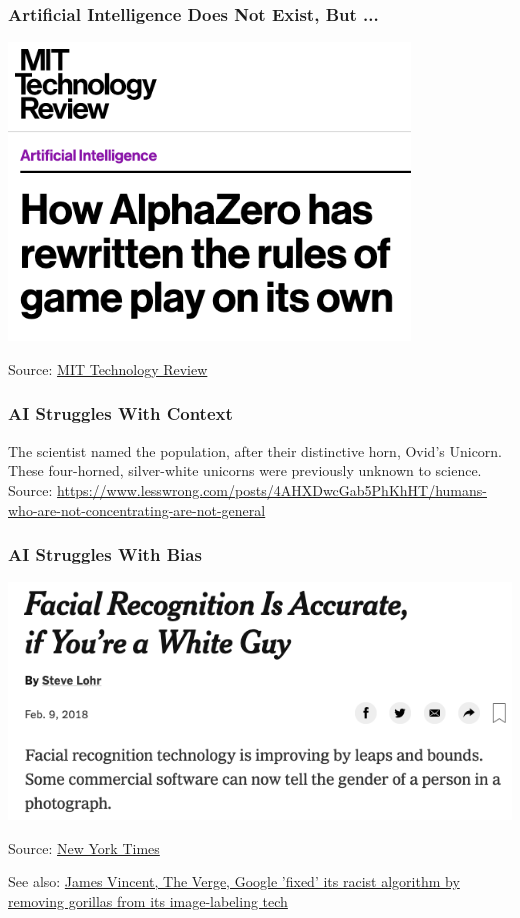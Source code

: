 \documentclass[xcolor=dvipsnames]{beamer}
\begin{document}
\begin{frame}
\frametitle{Artificial Intelligence Does Not Exist, But ...}
\includegraphics[width=0.8\textwidth]{figures/alpha_go}

Source: \href{https://www.technologyreview.com/s/612923/how-alphazero-has-rewritten-the-rules-of-gameplay-on-its-own/}{MIT Technology Review}
\end{frame}

\begin{frame}
\frametitle{AI Struggles With Context}
The scientist named the population, after their distinctive horn, Ovid’s Unicorn. These four-horned, silver-white unicorns were previously unknown to science.
Source: \href{https://www.lesswrong.com/posts/4AHXDwcGab5PhKhHT/humans-who-are-not-concentrating-are-not-general}{https://www.lesswrong.com/posts/4AHXDwcGab5PhKhHT/humans-who-are-not-concentrating-are-not-general}
\end{frame}

\begin{frame}
\frametitle{AI Struggles With Bias}
\includegraphics[width=\textwidth]{figures/facial_bias}

Source: \href{https://www.nytimes.com/2018/02/09/technology/facial-recognition-race-artificial-intelligence.html}{New York Times}

See also: \href{https://www.theverge.com/2018/1/12/16882408/google-racist-gorillas-photo-recognition-algorithm-ai}{James Vincent, The Verge, Google 'fixed' its racist algorithm by removing gorillas from its image-labeling tech}
\end{frame}
\end{document}
